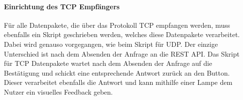 \paragraph{Einrichtung des TCP Empfängers}  
\label{sec:Einrichtung des TCP Empfängers-1} 
Für alle Datenpakete, die über das Protokoll TCP empfangen werden, muss ebenfalls ein Skript geschrieben werden, welches diese Datenpakete verarbeitet. Dabei wird genauso vorgegangen, wie beim Skript für UDP. Der einzige Unterschied ist nach dem Absenden der Anfrage an die REST API. Das Skript für TCP Datenpakete wartet nach dem Absenden der Anfrage auf die Bestätigung und schickt eine entsprechende Antwort zurück an den Button. Dieser verarbeitet ebenfalls die Antwort und kann mithilfe einer Lampe dem Nutzer ein visuelles Feedback geben. 